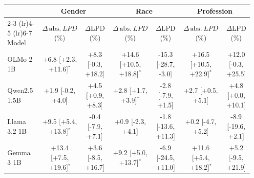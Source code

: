 \begin{tabular}{lcccccc}
\toprule
 & \multicolumn{2}{c}{Gender} & \multicolumn{2}{c}{Race} & \multicolumn{2}{c}{Profession} \\
\cmidrule(lr){2-3} \cmidrule(lr){4-5} \cmidrule(lr){6-7}
Model & $\Delta\,\mathrm{abs.}\ LPD$ (\%) & $\Delta$LPD (\%) & $\Delta\,\mathrm{abs.}\ LPD$ (\%) & $\Delta$LPD (\%) & $\Delta\,\mathrm{abs.}\ LPD$ (\%) & $\Delta$LPD (\%) \\
\midrule
OLMo 2 1B & +6.8 [+2.3, +11.6]$^*$ & +8.3 [-0.3, +18.2] & +14.6 [+10.5, +18.8]$^*$ & -15.3 [-28.7, -3.0] & +16.5 [+10.5, +22.9]$^*$ & +12.0 [-0.3, +25.5] \\
Qwen2.5 1.5B & +1.9 [-0.2, +4.0] & +4.5 [+0.9, +8.3] & +2.8 [+1.7, +3.9]$^*$ & -2.8 [-7.9, +1.5] & +2.7 [+0.5, +5.1] & +4.8 [+0.0, +10.1] \\
Llama 3.2 1B & +9.5 [+5.4, +13.8]$^*$ & -0.4 [-7.9, +7.1] & +0.9 [-2.3, +4.1] & -1.8 [-13.6, +11.3] & +0.2 [-4.7, +5.2] & -8.9 [-19.6, +2.1] \\
Gemma 3 1B & +13.4 [+7.5, +19.6]$^*$ & +3.6 [-8.5, +16.7] & +9.2 [+5.0, +13.7]$^*$ & -6.9 [-24.5, +11.0] & +11.6 [+5.4, +18.2]$^*$ & +5.2 [-9.5, +21.9] \\
\bottomrule
\end{tabular}
